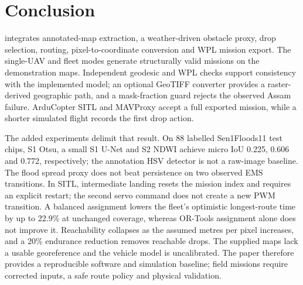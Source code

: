 \section{Conclusion}
\label{sec:conclusion}
\adapt{} integrates annotated-map extraction, a weather-driven obstacle proxy, drop selection, routing, pixel-to-coordinate conversion and WPL mission export. The single-UAV and fleet modes generate structurally valid missions on the demonstration maps. Independent geodesic and WPL checks support consistency with the implemented model; an optional GeoTIFF converter provides a raster-derived geographic path, and a mask-fraction guard rejects the observed Assam failure. ArduCopter SITL and MAVProxy accept a full exported mission, while a shorter simulated flight records the first drop action.

The added experiments delimit that result. On 88 labelled Sen1Floods11 test chips, S1 Otsu, a small S1 U-Net and S2 NDWI achieve micro IoU 0.225, 0.606 and 0.772, respectively; the annotation HSV detector is not a raw-image baseline. The flood spread proxy does not beat persistence on two observed EMS transitions. In SITL, intermediate landing resets the mission index and requires an explicit restart; the second servo command does not create a new PWM transition. A balanced assignment lowers the fleet's optimistic longest-route time by up to 22.9\% at unchanged coverage, whereas OR-Tools assignment alone does not improve it. Reachability collapses as the assumed metres per pixel increases, and a 20\% endurance reduction removes reachable drops. The supplied maps lack a usable georeference and the vehicle model is uncalibrated. The paper therefore provides a reproducible software and simulation baseline; field missions require corrected inputs, a safe route policy and physical validation.
